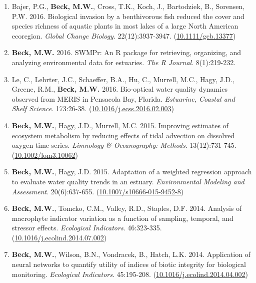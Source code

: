 \documentclass[letterpaper,12pt]{article}
\begin{document}
\begin{enumerate}
\item Bajer, P.G., \textbf{Beck, M.W.}, Cross, T.K., Koch, J., Bartodziek, B., Sorensen, P.W. 2016. Biological invasion by a benthivorous fish reduced the cover and species richness of aquatic plants in most lakes of a large North American ecoregion. \textit{Global Change Biology}. 22(12):3937-3947. ({\footnotesize\href{http://dx.doi.org/10.1111/gcb.13377}{10.1111/gcb.13377}})

\item \textbf{Beck, M.W.} 2016. SWMPr: An R package for retrieving, organizing, and analyzing environmental data for estuaries. \textit{The R Journal}. 8(1):219-232.

\item Le, C., Lehrter, J.C., Schaeffer, B.A., Hu, C., Murrell, M.C., Hagy, J.D., Greene, R.M., \textbf{Beck, M.W.} 2016. Bio-optical water quality dynamics observed from MERIS in Pensacola Bay, Florida. \textit{Estuarine, Coastal and Shelf Science}. 173:26-38. ({\footnotesize\href{https://doi.org/10.1016/j.ecss.2016.02.003}{10.1016/j.ecss.2016.02.003}})

\item \textbf{Beck, M.W.}, Hagy, J.D., Murrell, M.C. 2015. Improving estimates of ecosystem metabolism by reducing effects of tidal advection on dissolved oxygen time series. \textit{Limnology \& Oceanography: Methods}. 13(12):731-745. ({\footnotesize\href{http://dx.doi.org/10.1002/lom3.10062}{10.1002/lom3.10062}})

\item \textbf{Beck, M.W.}, Hagy, J.D. 2015. Adaptation of a weighted regression approach to evaluate water quality trends in an estuary. \textit{Environmental Modeling and Assessment}. 20(6):637-655. ({\footnotesize\href{http://dx.doi.org/10.1007/s10666-015-9452-8}{10.1007/s10666-015-9452-8}})

\item \textbf{Beck, M.W.}, Tomcko, C.M., Valley, R.D., Staples, D.F. 2014. Analysis of macrophyte indicator variation as a function of sampling, temporal, and stressor effects. \textit{Ecological Indicators}. 46:323-335. ({\footnotesize\href{https://doi.org/10.1016/j.ecolind.2014.07.002}{10.1016/j.ecolind.2014.07.002}})

\item \textbf{Beck, M.W.}, Wilson, B.N., Vondracek, B., Hatch, L.K. 2014. Application of neural networks to quantify utility of indices of biotic integrity for biological monitoring. \textit{Ecological Indicators}. 45:195-208. ({\footnotesize\href{https://doi.org/10.1016/j.ecolind.2014.04.002}{10.1016/j.ecolind.2014.04.002}})


\end{enumerate}
\end{document}
